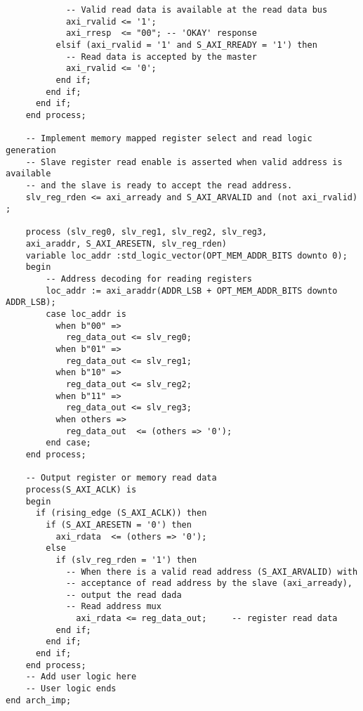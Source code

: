 \begin{lstlisting}
	        -- Valid read data is available at the read data bus
	        axi_rvalid <= '1';
	        axi_rresp  <= "00"; -- 'OKAY' response
	      elsif (axi_rvalid = '1' and S_AXI_RREADY = '1') then
	        -- Read data is accepted by the master
	        axi_rvalid <= '0';
	      end if;            
	    end if;
	  end if;
	end process;

	-- Implement memory mapped register select and read logic generation
	-- Slave register read enable is asserted when valid address is available
	-- and the slave is ready to accept the read address.
	slv_reg_rden <= axi_arready and S_AXI_ARVALID and (not axi_rvalid) ;

	process (slv_reg0, slv_reg1, slv_reg2, slv_reg3,
    axi_araddr, S_AXI_ARESETN, slv_reg_rden)
	variable loc_addr :std_logic_vector(OPT_MEM_ADDR_BITS downto 0);
	begin
	    -- Address decoding for reading registers
	    loc_addr := axi_araddr(ADDR_LSB + OPT_MEM_ADDR_BITS downto ADDR_LSB);
	    case loc_addr is
	      when b"00" =>
	        reg_data_out <= slv_reg0;
	      when b"01" =>
	        reg_data_out <= slv_reg1;
	      when b"10" =>
	        reg_data_out <= slv_reg2;
	      when b"11" =>
	        reg_data_out <= slv_reg3;
	      when others =>
	        reg_data_out  <= (others => '0');
	    end case;
	end process; 

	-- Output register or memory read data
	process(S_AXI_ACLK) is
	begin
	  if (rising_edge (S_AXI_ACLK)) then
	    if (S_AXI_ARESETN = '0') then
	      axi_rdata  <= (others => '0');
	    else
	      if (slv_reg_rden = '1') then
	        -- When there is a valid read address (S_AXI_ARVALID) with 
	        -- acceptance of read address by the slave (axi_arready), 
	        -- output the read dada 
	        -- Read address mux
	          axi_rdata <= reg_data_out;     -- register read data
	      end if;   
	    end if;
	  end if;
	end process;
	-- Add user logic here
	-- User logic ends
end arch_imp;

\end{lstlisting}